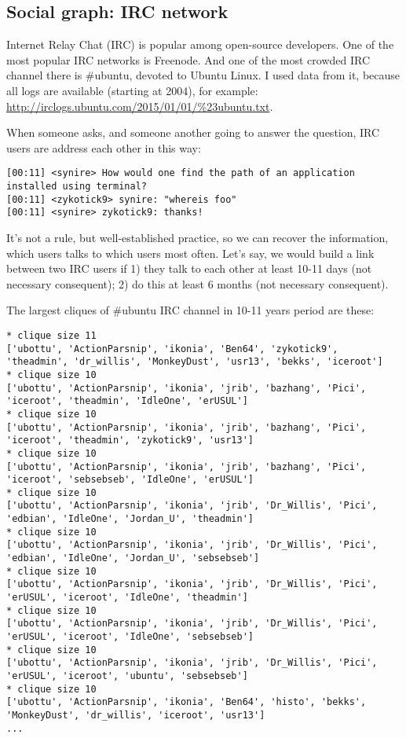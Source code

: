 \begin{figure}[H]
\centering
{}
\end{figure}

\subsection{Social graph: IRC network}

Internet Relay Chat (IRC) is popular among open-source developers.
One of the most popular IRC networks is Freenode.
And one of the most crowded IRC channel there is \#ubuntu, devoted to Ubuntu Linux.
I used data from it, because all logs are available (starting at 2004), for example:
\url{http://irclogs.ubuntu.com/2015/01/01/%23ubuntu.txt}.

When someone asks, and someone another going to answer the question, IRC users are address each other in this way:

\begin{lstlisting}
[00:11] <synire> How would one find the path of an application installed using terminal?
[00:11] <zykotick9> synire: "whereis foo"
[00:11] <synire> zykotick9: thanks!
\end{lstlisting}

It's not a rule, but well-established practice, so we can recover the information, which users talks to which users most often.
Let's say, we would build a link between two IRC users if 
1) they talk to each other at least 10-11 days (not necessary consequent);
2) do this at least 6 months (not necessary consequent).

The largest cliques of \#ubuntu IRC channel in 10-11 years period are these:

\begin{lstlisting}
* clique size 11
['ubottu', 'ActionParsnip', 'ikonia', 'Ben64', 'zykotick9', 'theadmin', 'dr_willis', 'MonkeyDust', 'usr13', 'bekks', 'iceroot']
* clique size 10
['ubottu', 'ActionParsnip', 'ikonia', 'jrib', 'bazhang', 'Pici', 'iceroot', 'theadmin', 'IdleOne', 'erUSUL']
* clique size 10
['ubottu', 'ActionParsnip', 'ikonia', 'jrib', 'bazhang', 'Pici', 'iceroot', 'theadmin', 'zykotick9', 'usr13']
* clique size 10
['ubottu', 'ActionParsnip', 'ikonia', 'jrib', 'bazhang', 'Pici', 'iceroot', 'sebsebseb', 'IdleOne', 'erUSUL']
* clique size 10
['ubottu', 'ActionParsnip', 'ikonia', 'jrib', 'Dr_Willis', 'Pici', 'edbian', 'IdleOne', 'Jordan_U', 'theadmin']
* clique size 10
['ubottu', 'ActionParsnip', 'ikonia', 'jrib', 'Dr_Willis', 'Pici', 'edbian', 'IdleOne', 'Jordan_U', 'sebsebseb']
* clique size 10
['ubottu', 'ActionParsnip', 'ikonia', 'jrib', 'Dr_Willis', 'Pici', 'erUSUL', 'iceroot', 'IdleOne', 'theadmin']
* clique size 10
['ubottu', 'ActionParsnip', 'ikonia', 'jrib', 'Dr_Willis', 'Pici', 'erUSUL', 'iceroot', 'IdleOne', 'sebsebseb']
* clique size 10
['ubottu', 'ActionParsnip', 'ikonia', 'jrib', 'Dr_Willis', 'Pici', 'erUSUL', 'iceroot', 'ubuntu', 'sebsebseb']
* clique size 10
['ubottu', 'ActionParsnip', 'ikonia', 'Ben64', 'histo', 'bekks', 'MonkeyDust', 'dr_willis', 'iceroot', 'usr13']
...
\end{lstlisting}


